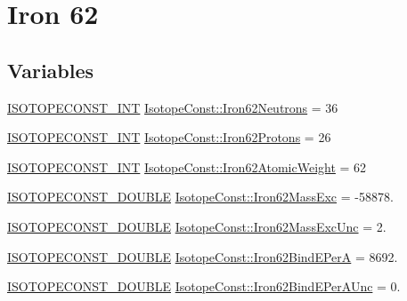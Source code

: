 \hypertarget{group___isotope_const-_iron-_fe62}{}\section{Iron 62}
\label{group___isotope_const-_iron-_fe62}
\subsection*{Variables}
\begin{DoxyCompactItemize}
\item 
\mbox{\hyperlink{group___isotope_const-_macros_ga5f18360b3e99483a35c32d789e62621c}{I\+S\+O\+T\+O\+P\+E\+C\+O\+N\+S\+T\+\_\+\+I\+NT}} \mbox{\hyperlink{group___isotope_const-_iron-_fe62_ga828b0d511fa22f6b52671ec3c17a2245}{Isotope\+Const\+::\+Iron62\+Neutrons}} = 36
\item 
\mbox{\hyperlink{group___isotope_const-_macros_ga5f18360b3e99483a35c32d789e62621c}{I\+S\+O\+T\+O\+P\+E\+C\+O\+N\+S\+T\+\_\+\+I\+NT}} \mbox{\hyperlink{group___isotope_const-_iron-_fe62_ga0a6cd25ba63a4433b9a744f737fca378}{Isotope\+Const\+::\+Iron62\+Protons}} = 26
\item 
\mbox{\hyperlink{group___isotope_const-_macros_ga5f18360b3e99483a35c32d789e62621c}{I\+S\+O\+T\+O\+P\+E\+C\+O\+N\+S\+T\+\_\+\+I\+NT}} \mbox{\hyperlink{group___isotope_const-_iron-_fe62_gab6bf8cf0ef831ce12cd23159c099306e}{Isotope\+Const\+::\+Iron62\+Atomic\+Weight}} = 62
\item 
\mbox{\hyperlink{group___isotope_const-_macros_ga8f45a7272ce02c0b4c65c44636ed719a}{I\+S\+O\+T\+O\+P\+E\+C\+O\+N\+S\+T\+\_\+\+D\+O\+U\+B\+LE}} \mbox{\hyperlink{group___isotope_const-_iron-_fe62_ga0f17a30de3c275cf920d7e91fbb0b01b}{Isotope\+Const\+::\+Iron62\+Mass\+Exc}} = -\/58878.
\item 
\mbox{\hyperlink{group___isotope_const-_macros_ga8f45a7272ce02c0b4c65c44636ed719a}{I\+S\+O\+T\+O\+P\+E\+C\+O\+N\+S\+T\+\_\+\+D\+O\+U\+B\+LE}} \mbox{\hyperlink{group___isotope_const-_iron-_fe62_ga3a9c6d335ced4c4ce7a43a864c6dc4e3}{Isotope\+Const\+::\+Iron62\+Mass\+Exc\+Unc}} = 2.
\item 
\mbox{\hyperlink{group___isotope_const-_macros_ga8f45a7272ce02c0b4c65c44636ed719a}{I\+S\+O\+T\+O\+P\+E\+C\+O\+N\+S\+T\+\_\+\+D\+O\+U\+B\+LE}} \mbox{\hyperlink{group___isotope_const-_iron-_fe62_ga8cde6af82cef858b438d97a3dd84f215}{Isotope\+Const\+::\+Iron62\+Bind\+E\+PerA}} = 8692.
\item 
\mbox{\hyperlink{group___isotope_const-_macros_ga8f45a7272ce02c0b4c65c44636ed719a}{I\+S\+O\+T\+O\+P\+E\+C\+O\+N\+S\+T\+\_\+\+D\+O\+U\+B\+LE}} \mbox{\hyperlink{group___isotope_const-_iron-_fe62_gabcc7ea2eb467d0f525e7193a0c6d3280}{Isotope\+Const\+::\+Iron62\+Bind\+E\+Per\+A\+Unc}} = 0.

\end{DoxyCompactItemize}
